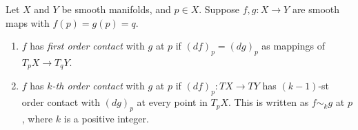 Let $X$ and $Y$ be smooth manifolds, and $p \in X$. Suppose $f, g: X \to Y$ are smooth maps with $f(p) = g(p) = q$.

\begin{enumerate}
\item $f$ has \textit{first order contact} with $g$ at $p$ if $(df)_p = (dg)_p$ as mappings of $T_p X \to T_q Y$.
\item $f$ has \textit{$k$-th order contact} with $g$ at $p$ if $(df)_p: TX \to TY$ has $(k-1)$-st order contact with $(dg)_p$ at every point in $T_p X$. This is written as $f \sim_k g$ at $p$, where $k$ is a positive integer.
\end{enumerate}
